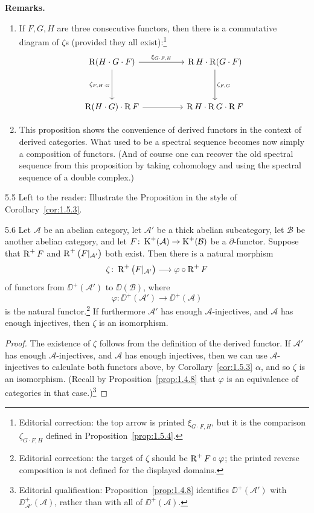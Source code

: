 \textbf{Remarks.}
\begin{enumerate}
\item If $F,G,H$ are three consecutive functors,
then there is a commutative diagram of $\zeta$s (provided they all
exist):\footnote{Editorial correction: the top arrow is printed $\xi_{G\cdot F,H}$, but it is the comparison $\zeta_{G\cdot F,H}$ defined in Proposition~\ref{prop:1.5.4}.}
\[
\begin{tikzcd}
	\RR(H \cdot G \cdot F)
	\arrow[rr, "\xi_{G \cdot F, H}"]
	\arrow[dd, "\zeta_{F, H \cdot G}"']
	& &
	\RR H \cdot \RR(G \cdot F)
	\arrow[dd, "\zeta_{F, G}"] \\
	\\
	\RR(H \cdot G) \cdot \RR F
	\arrow[rr]
	& &
	\RR H \cdot \RR G \cdot \RR F
\end{tikzcd}
\]
\item This proposition shows the convenience of derived
functors in the context of derived categories. What used to be
a
spectral sequence becomes now simply a composition of functors.
(And of course one can recover the old spectral sequence from
this proposition by taking cohomology and using the spectral
sequence of a double complex.)
\end{enumerate}
\begin{bookcorollary}{5.5}\label{cor:1.5.5}
Left to the reader: Illustrate the Proposition in the style of Corollary~\ref{cor:1.5.3}.
\end{bookcorollary}
\begin{bookproposition}{5.6}\label{prop:1.5.6}
Let $\mathcal{A}$ be an abelian category, let $\mathcal{A}'$ be a thick abelian subcategory, let $\mathcal{B}$ be another abelian category, and let $F\colon\operatorname{K}^+(\mathcal{A})\to\operatorname{K}^+(\mathcal{B})$ be a $\partial$-functor. Suppose that $\operatorname{R}^+F$ and $\operatorname{R}^+\big(F|_{\mathcal{A}'}\big)$ both exist. Then there is a natural morphism
\[
\zeta\colon \operatorname{R}^+\big(F|_{\mathcal{A}'}\big) \longrightarrow \varphi\circ\operatorname{R}^+F
\]
of functors from $\DD^+(\mathcal{A}')$ to $\DD(\mathcal{B})$, where
\[
\varphi\colon\DD^+(\mathcal{A}')\longrightarrow\DD^+(\mathcal{A})
\]
is the natural functor.\footnote{Editorial correction: the target of $\zeta$ should be $\operatorname{R}^+F\circ\varphi$; the printed reverse composition is not defined for the displayed domains.} If furthermore $\mathcal{A}'$ has enough $\mathcal{A}$-injectives, and $\mathcal{A}$ has enough injectives, then $\zeta$ is an isomorphism.
\end{bookproposition}

\begin{proof}
The existence of $\zeta$ follows from the definition of the derived functor. If $\mathcal{A}'$ has enough $\mathcal{A}$-injectives, and $\mathcal{A}$ has enough injectives, then we can use $\mathcal{A}$-injectives to calculate both functors above, by Corollary~\ref{cor:1.5.3} $\alpha$, and so $\zeta$ is an isomorphism. (Recall by Proposition~\ref{prop:1.4.8} that $\varphi$ is an equivalence of categories in that case.)\footnote{Editorial qualification: Proposition~\ref{prop:1.4.8} identifies $\DD^+(\mathcal{A}')$ with $\DD_{\mathcal{A}'}^+(\mathcal{A})$, rather than with all of $\DD^+(\mathcal{A})$.}
\end{proof}


